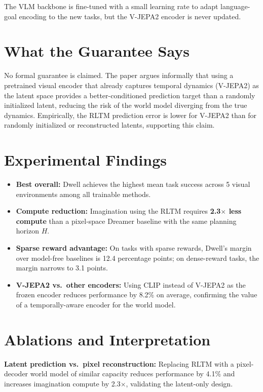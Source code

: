 \documentclass[10pt,twocolumn]{article}
\begin{document}
The VLM backbone is fine-tuned with a small learning rate to adapt
language-goal encoding to the new tasks, but the V-JEPA2 encoder is
never updated.

\section{What the Guarantee Says}

No formal guarantee is claimed. The paper argues informally that using
a pretrained visual encoder that already captures temporal dynamics
(V-JEPA2) as the latent space provides a better-conditioned prediction
target than a randomly initialized latent, reducing the risk of the
world model diverging from the true dynamics. Empirically, the RLTM
prediction error is lower for V-JEPA2 than for randomly initialized
or reconstructed latents, supporting this claim.

\section{Experimental Findings}

\begin{itemize}[itemsep=2pt,parsep=0pt]
  \item \textbf{Best overall:} Dwell achieves the highest mean
    task success across 5 visual environments among all
    trainable methods.
  \item \textbf{Compute reduction:} Imagination using the RLTM
    requires \textbf{2.3$\times$ less compute} than a pixel-space
    Dreamer baseline with the same planning horizon $H$.
  \item \textbf{Sparse reward advantage:} On tasks with sparse
    rewards, Dwell's margin over model-free baselines is 12.4
    percentage points; on dense-reward tasks, the margin narrows
    to 3.1 points.
  \item \textbf{V-JEPA2 vs.\ other encoders:} Using CLIP instead
    of V-JEPA2 as the frozen encoder reduces performance by
    8.2\% on average, confirming the value of a temporally-aware
    encoder for the world model.
\end{itemize}

\section{Ablations and Interpretation}

\textbf{Latent prediction vs.\ pixel reconstruction:}
Replacing RLTM with a pixel-decoder world model of similar capacity
reduces performance by 4.1\% and increases imagination compute
by 2.3$\times$, validating the latent-only design.
\end{document}
